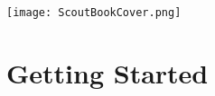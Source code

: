 \documentclass[a4paper,10pt,twoside]{book}
\begin{document}
\ifpdf
  
\else
  \texttt{[image: ScoutBookCover.png]}
\fi

\thispagestyle{empty}
\frontmatter




\pagestyle{plain}

\tableofcontents
\sloppy


\mainmatter


\pagestyle{headings}

\part{Getting Started}




% 

% 

% 
% 
% 
% 
% 
\end{document}
